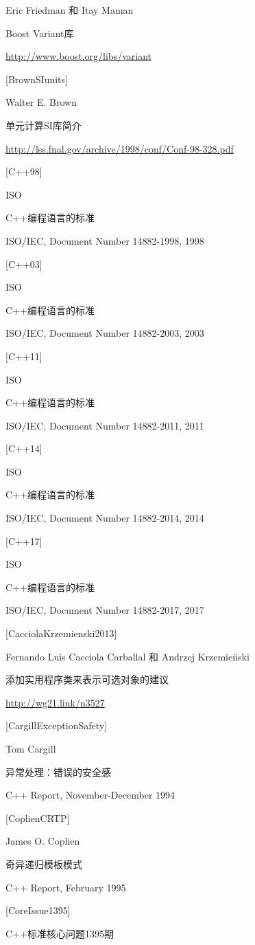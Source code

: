 Eric Friedman 和 Itay Maman

Boost Variant库

\url{http://www.boost.org/libs/variant}

{[BrownSIunits]}

Walter E. Brown

单元计算SI库简介

\url{http://lss.fnal.gov/archive/1998/conf/Conf-98-328.pdf}

{[C++98]}

ISO

C++编程语言的标准

ISO/IEC, Document Number 14882-1998, 1998

{[C++03]}

ISO

C++编程语言的标准

ISO/IEC, Document Number 14882-2003, 2003

{[C++11]}

ISO

C++编程语言的标准

ISO/IEC, Document Number 14882-2011, 2011

{[C++14]}

ISO

C++编程语言的标准

ISO/IEC, Document Number 14882-2014, 2014

{[C++17]}

ISO

C++编程语言的标准

ISO/IEC, Document Number 14882-2017, 2017

{[CacciolaKrzemienski2013]}

Fernando Luis Cacciola Carballal 和 Andrzej Krzemie{\"n}ski

添加实用程序类来表示可选对象的建议

\url{http://wg21.link/n3527}

{[CargillExceptionSafety]}

Tom Cargill

异常处理：错误的安全感

C++ Report, November-December 1994

{[CoplienCRTP]}

James O. Coplien

奇异递归模板模式

C++ Report, February 1995

{[CoreIssue1395]}

C++标准核心问题1395期

